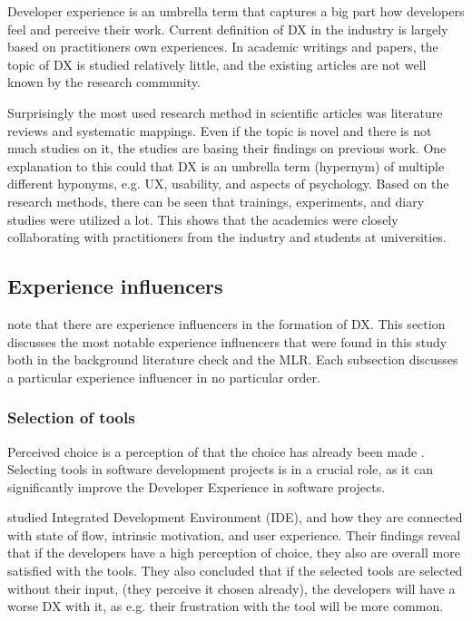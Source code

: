 \documentclass[english, 12pt, a4paper, sci, utf8, a-1b, online]{aaltothesis}
\begin{document}
Developer experience is an umbrella term that captures a big part how developers feel and perceive their work. Current definition of DX in the industry is largely based on practitioners own experiences. In academic writings and papers, the topic of DX is studied relatively little, and the existing articles are not well known by the research community.

Surprisingly the most used research method in scientific articles was literature reviews and systematic mappings. Even if the topic is novel and there is not much studies on it, the studies are basing their findings on previous work. One explanation to this could that DX is an umbrella term (hypernym) of multiple different hyponyms, e.g. UX, usability, and aspects of psychology. Based on the research methods, there can be seen that trainings, experiments, and diary studies were utilized a lot. This shows that the academics were closely collaborating with practitioners from the industry and students at universities.

\subsection{Experience influencers}

\textcite{fagerholm-doctoral-thesis} note that there are experience influencers in the formation of DX. This section discusses the most notable experience influencers that were found in this study both in the background literature check and the MLR. Each subsection discusses a particular experience influencer in no particular order.

\subsubsection{Selection of tools}

Perceived choice is a perception of that the choice has already been made \parencite{flow-intrinsic-dx}. Selecting tools in software development projects is in a crucial role, as it can significantly improve the Developer Experience in software projects.

\textcite{flow-intrinsic-dx} studied Integrated Development Environment (IDE), and how they are connected with state of flow, intrinsic motivation, and user experience. Their findings reveal that if the developers have a high perception of choice, they also are overall more satisfied with the tools. They also concluded that if the selected tools are selected without their input, (they perceive it chosen already), the developers will have a worse DX with it, as e.g. their frustration with the tool will be more common.
\end{document}
